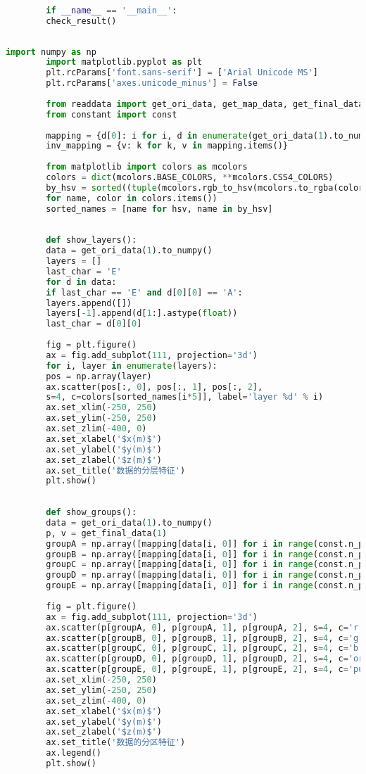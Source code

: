 \documentclass[withoutpreface,bwprint,fontset=macnew]{cumcmthesis} %
\begin{document}
\begin{appendices}
\begin{lstlisting}[language=python]
		
		if __name__ == '__main__':
		check_result()
		
	\end{lstlisting}
	
	\begin{lstlisting}[language=python]
		import numpy as np
		import matplotlib.pyplot as plt
		plt.rcParams['font.sans-serif'] = ['Arial Unicode MS']
		plt.rcParams['axes.unicode_minus'] = False
		
		from readdata import get_ori_data, get_map_data, get_final_data
		from constant import const
		
		mapping = {d[0]: i for i, d in enumerate(get_ori_data(1).to_numpy())}
		inv_mapping = {v: k for k, v in mapping.items()}
		
		from matplotlib import colors as mcolors
		colors = dict(mcolors.BASE_COLORS, **mcolors.CSS4_COLORS)
		by_hsv = sorted((tuple(mcolors.rgb_to_hsv(mcolors.to_rgba(color)[:3])), name)
		for name, color in colors.items())
		sorted_names = [name for hsv, name in by_hsv]
		
		
		def show_layers():
		data = get_ori_data(1).to_numpy()
		layers = []
		last_char = 'E'
		for d in data:
		if last_char == 'E' and d[0][0] == 'A':
		layers.append([])
		layers[-1].append(d[1:].astype(float))
		last_char = d[0][0]
		
		fig = plt.figure()
		ax = fig.add_subplot(111, projection='3d')
		for i, layer in enumerate(layers):
		pos = np.array(layer)
		ax.scatter(pos[:, 0], pos[:, 1], pos[:, 2],
		s=4, c=colors[sorted_names[i*5]], label='layer %d' % i)
		ax.set_xlim(-250, 250)
		ax.set_ylim(-250, 250)
		ax.set_zlim(-400, 0)
		ax.set_xlabel('$x(m)$')
		ax.set_ylabel('$y(m)$')
		ax.set_zlabel('$z(m)$')
		ax.set_title('数据的分层特征')
		plt.show()
		
		
		def show_groups():
		data = get_ori_data(1).to_numpy()
		p, v = get_final_data(1)
		groupA = np.array([mapping[data[i, 0]] for i in range(const.n_points) if data[i, 0][0] == 'A'])
		groupB = np.array([mapping[data[i, 0]] for i in range(const.n_points) if data[i, 0][0] == 'B'])
		groupC = np.array([mapping[data[i, 0]] for i in range(const.n_points) if data[i, 0][0] == 'C'])
		groupD = np.array([mapping[data[i, 0]] for i in range(const.n_points) if data[i, 0][0] == 'D'])
		groupE = np.array([mapping[data[i, 0]] for i in range(const.n_points) if data[i, 0][0] == 'E'])
		
		fig = plt.figure()
		ax = fig.add_subplot(111, projection='3d')
		ax.scatter(p[groupA, 0], p[groupA, 1], p[groupA, 2], s=4, c='r', label='A')
		ax.scatter(p[groupB, 0], p[groupB, 1], p[groupB, 2], s=4, c='g', label='B')
		ax.scatter(p[groupC, 0], p[groupC, 1], p[groupC, 2], s=4, c='b', label='C')
		ax.scatter(p[groupD, 0], p[groupD, 1], p[groupD, 2], s=4, c='orange', label='D')
		ax.scatter(p[groupE, 0], p[groupE, 1], p[groupE, 2], s=4, c='purple', label='E')
		ax.set_xlim(-250, 250)
		ax.set_ylim(-250, 250)
		ax.set_zlim(-400, 0)
		ax.set_xlabel('$x(m)$')
		ax.set_ylabel('$y(m)$')
		ax.set_zlabel('$z(m)$')
		ax.set_title('数据的分区特征')
		ax.legend()
		plt.show()
		

\end{lstlisting}
\end{appendices}
\end{document}
